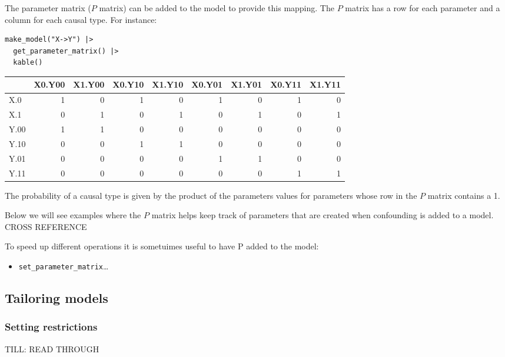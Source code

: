 \documentclass[
  article]{jss}
\providecommand{\tightlist}{%
  \setlength{\itemsep}{0pt}\setlength{\parskip}{0pt}}\usepackage{longtable,booktabs,array}
\begin{document}
The parameter matrix (\(P\) matrix) can be added to the model to provide
this mapping. The \(P\) matrix has a row for each parameter and a column
for each causal type. For instance:

\begin{verbatim}
make_model("X->Y") |> 
  get_parameter_matrix() |>
  kable()
\end{verbatim}

\begin{longtable}[]{@{}lrrrrrrrr@{}}
\toprule()
& X0.Y00 & X1.Y00 & X0.Y10 & X1.Y10 & X0.Y01 & X1.Y01 & X0.Y11 &
X1.Y11 \\
\midrule()
\endhead
X.0 & 1 & 0 & 1 & 0 & 1 & 0 & 1 & 0 \\
X.1 & 0 & 1 & 0 & 1 & 0 & 1 & 0 & 1 \\
Y.00 & 1 & 1 & 0 & 0 & 0 & 0 & 0 & 0 \\
Y.10 & 0 & 0 & 1 & 1 & 0 & 0 & 0 & 0 \\
Y.01 & 0 & 0 & 0 & 0 & 1 & 1 & 0 & 0 \\
Y.11 & 0 & 0 & 0 & 0 & 0 & 0 & 1 & 1 \\
\bottomrule()
\end{longtable}

The probability of a causal type is given by the product of the
parameters values for parameters whose row in the \(P\) matrix contains
a 1.

Below we will see examples where the \(P\) matrix helps keep track of
parameters that are created when confounding is added to a model. CROSS
REFERENCE

To speed up different operations it is sometuimes useful to have P added
to the model:

\begin{itemize}
\tightlist
\item
  \texttt{set\_parameter\_matrix}\ldots{}
\end{itemize}

\hypertarget{tailoring-models}{%
\subsection{Tailoring models}\label{tailoring-models}}

\hypertarget{restrictions}{%
\subsubsection{Setting restrictions}\label{restrictions}}

TILL: READ THROUGH
\end{document}

